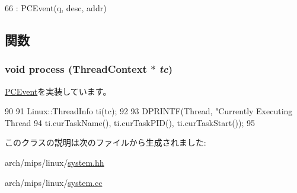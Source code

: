 \begin{DoxyCode}
66             : PCEvent(q, desc, addr) {}
\end{DoxyCode}


\subsection{関数}
\hypertarget{classLinuxMipsSystem_1_1PrintThreadInfo_ad66a9d5ec7cfe597b848a17c0df5cc28}{
\subsubsection[{process}]{\setlength{\rightskip}{0pt plus 5cm}void process ({\bf ThreadContext} $\ast$ {\em tc})}}
\label{classLinuxMipsSystem_1_1PrintThreadInfo_ad66a9d5ec7cfe597b848a17c0df5cc28}


\hyperlink{classPCEvent_af6ff225900b7b98c08880da7225b38f0}{PCEvent}を実装しています。


\begin{DoxyCode}
90 {
91     Linux::ThreadInfo ti(tc);
92 
93     DPRINTF(Thread, "Currently Executing Thread %
94             ti.curTaskName(), ti.curTaskPID(), ti.curTaskStart());
95 }
\end{DoxyCode}


このクラスの説明は次のファイルから生成されました:\begin{DoxyCompactItemize}
\item 
arch/mips/linux/\hyperlink{arch_2mips_2linux_2system_8hh}{system.hh}\item 
arch/mips/linux/\hyperlink{arch_2mips_2linux_2system_8cc}{system.cc}\end{DoxyCompactItemize}
